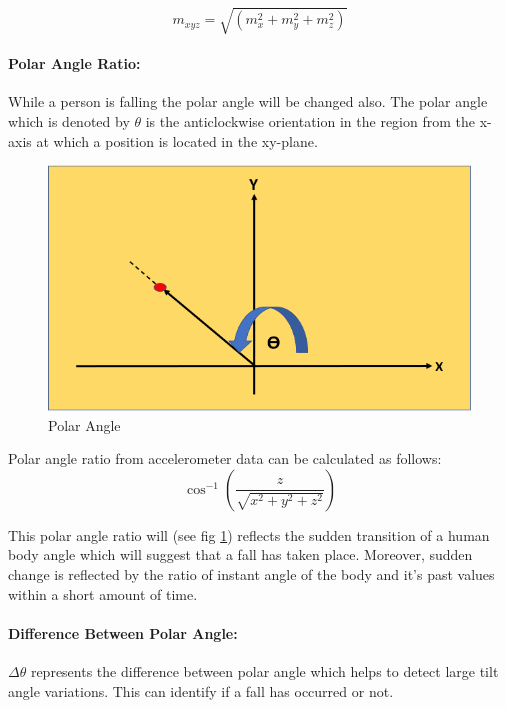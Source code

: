 \begin{equation}
     m_{xyz}=\sqrt{(m_x^2 +m_y^2+m_z^2 )}
\end{equation}

\paragraph{\textbf{Polar Angle Ratio:}}
While a person is falling the polar angle will be changed also. The polar angle which is denoted by $\theta$  is the anticlockwise orientation in the region from the x-axis at which a position is located in the xy-plane.


\begin{figure}[!ht]
    \centering
    \includegraphics[scale=0.5]{Chap4/Polar.PNG}
    \caption{Polar Angle}
    \label{fig:Polar Angle}
\end{figure}

Polar angle ratio from accelerometer data can be calculated as follows:
\begin{equation}
    \cos^{-1}\left(\frac{z}{\sqrt{x^2+y^2+z^2}}\right)
\end{equation}


 
 This polar angle ratio will (see fig \ref{fig:Polar Angle}) reflects the  sudden transition of a human body angle which will suggest that a fall has taken place. Moreover, sudden change is reflected by the ratio of instant angle of the body and it's past values within a short amount of time.


 \paragraph{\textbf{Difference Between Polar Angle:}}
 $\Delta\theta$ represents the difference between polar angle which helps to detect large tilt angle variations. This can identify if a fall has occurred or not.

